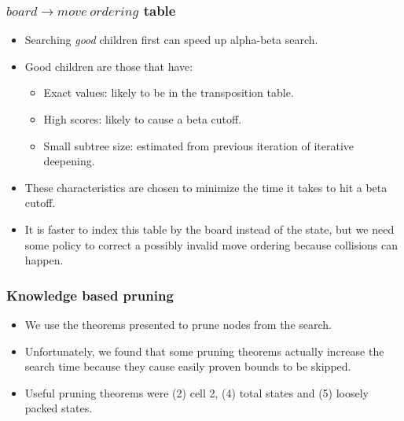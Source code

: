 \documentclass{beamer}
\begin{document}
    \begin{frame}
        \frametitle{$board \rightarrow move\ ordering$ table}
        \begin{itemize}
            \item Searching \textit{good} children first can speed up alpha-beta search.
            \item Good children are those that have:
                \begin{itemize}
                    \item Exact values: likely to be in the transposition table.
                    \item High scores: likely to cause a beta cutoff.
                    \item Small subtree size: estimated from previous iteration of iterative deepening.
                \end{itemize}
            \item These characteristics are chosen to minimize the time it takes to hit a beta cutoff.
            \item It is faster to index this table by the board instead of the state, but we need some policy
                to correct a possibly invalid move ordering because collisions can happen.
        \end{itemize}
    \end{frame}

    \begin{frame}
        \frametitle{Knowledge based pruning}
        \begin{itemize}
            \item We use the theorems presented to prune nodes from the search.
            \item Unfortunately, we found that some pruning theorems actually increase the search time
                because they cause easily proven bounds to be skipped.
            \item Useful pruning theorems were (2) cell 2, (4) total states and (5) loosely packed states.
        \end{itemize}
    \end{frame}
\end{document}
